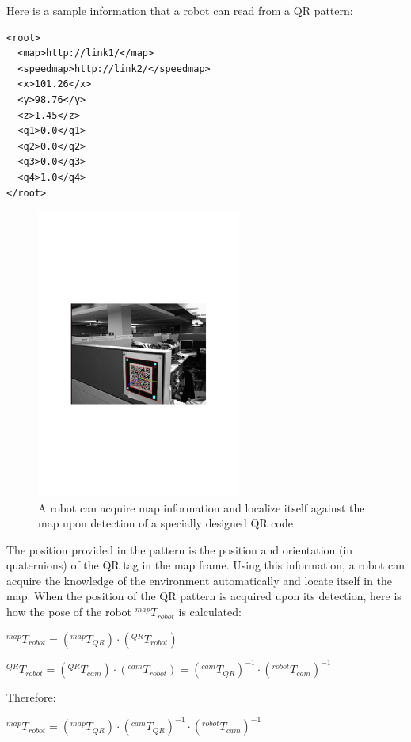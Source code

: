 Here is a sample information that a robot can read from a QR pattern:

\begin{lstlisting}
<root>
  <map>http://link1/</map>
  <speedmap>http://link2/</speedmap>
  <x>101.26</x>
  <y>98.76</y>
  <z>1.45</z>
  <q1>0.0</q1>
  <q2>0.0</q2>
  <q3>0.0</q3>
  <q4>1.0</q4>
</root>
\end{lstlisting}

\begin{figure}[ht!]
\centering
\includegraphics[width=0.6\textwidth]{pics/qrcode}
\caption{A robot can acquire map information and localize itself against the map upon detection of a specially designed QR code}
\label{fig:qr}
\end{figure}

The position provided in the pattern is the position and orientation (in quaternions) of the QR tag in the map frame. Using this information, a robot can acquire the knowledge of the environment automatically and locate itself in the map. When the position of the QR pattern is acquired upon its detection, here is how the pose of the robot $^{map}T_{robot}$ is calculated:

$^{map}T_{robot}=(^{map}T_{QR}) \cdot (^{QR}T_{robot})$

$^{QR}T_{robot}=(^{QR}T_{cam}) \cdot (^{cam}T_{robot})=(^{cam}T_{QR})^{-1} \cdot (^{robot}T_{cam})^{-1}$

Therefore:

$^{map}T_{robot}=(^{map}T_{QR}) \cdot (^{cam}T_{QR})^{-1} \cdot (^{robot}T_{cam})^{-1}$


